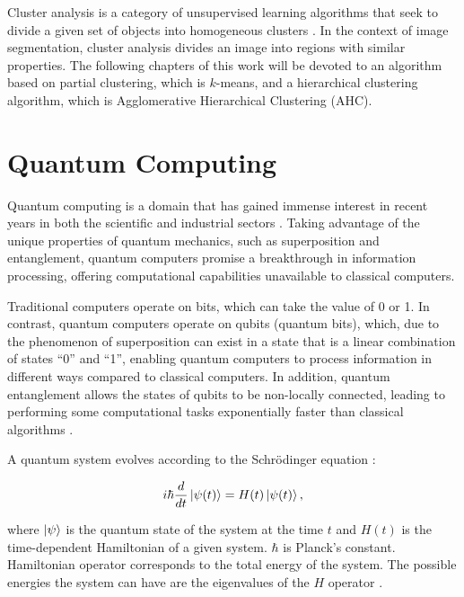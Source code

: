 \documentclass[a4paper,12pt]{article}
\begin{document}
Cluster analysis is a category of unsupervised learning algorithms that seek to divide a given set of objects into homogeneous clusters \cite{Bratchell1989}. In the context of image segmentation, cluster analysis divides an image into regions with similar properties. The following chapters of this work will be devoted to an algorithm based on partial clustering, which is $k$-means, and a hierarchical clustering algorithm, which is Agglomerative Hierarchical Clustering (AHC).

\section{Quantum Computing}\label{quantum_computing}

Quantum computing is a domain that has gained immense interest in recent years in both the scientific and industrial sectors \cite{Flother2023, Ahmed2024, Orus2019, Phillipson2024}. Taking advantage of the unique properties of quantum mechanics, such as superposition and entanglement, quantum computers promise a breakthrough in information processing, offering computational capabilities unavailable to classical computers.

Traditional computers operate on bits, which can take the value of 0 or 1. In contrast, quantum computers operate on qubits (quantum bits), which, due to the phenomenon of superposition can exist in a state that is a linear combination of states ``0'' and ``1'', enabling quantum computers to process information in different ways compared to classical computers. In addition, quantum entanglement allows the states of qubits to be non-locally connected, leading to performing some computational tasks exponentially faster than classical algorithms \cite{Datta2005}.

A quantum system evolves according to the Schr\"odinger equation \cite{schuld2021}:

\begin{equation}\label{shrodinger}
    i \hbar \frac{d}{dt} \ket{\psi(t)} = H(t) \ket{\psi(t)},
\end{equation}

\noindent where $\ket{\psi}$ is the quantum state of the system at the time $t$ and $H(t)$ is the time-dependent Hamiltonian of a given system. $\hbar$ is Planck’s constant. Hamiltonian operator corresponds to the total energy of the system. The possible energies the system can have are the eigenvalues of the $H$ operator \cite{schuld2021, McMahon2008}.
\end{document}

